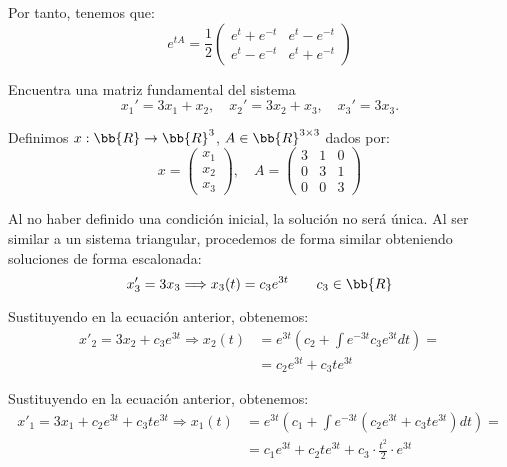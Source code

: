 \documentclass[12pt]{article}
\begin{document}
\begin{ejercicio}
        Por tanto, tenemos que:
        \begin{equation*}
            e^{tA} = \frac{1}{2}\begin{pmatrix}
                e^t+e^{-t} & e^t - e^{-t} \\
                e^t-e^{-t} & e^t+e^{-t}
            \end{pmatrix}
        \end{equation*}
    \end{ejercicio}

    \begin{ejercicio}
        Encuentra una matriz fundamental del sistema
        \begin{equation*}
            x_1' = 3x_1 + x_2, \quad x_2' = 3x_2+x_3,\quad x_3' = 3x_3.
        \end{equation*}

        Definimos $x:\bb{R}\to \bb{R}^3$, $A\in \bb{R}^{3\times 3}$ dados por:
        \begin{equation*}
            x=\begin{pmatrix}
                x_1 \\
                x_2 \\
                x_3
            \end{pmatrix},\quad A=\begin{pmatrix}
                3 & 1 & 0 \\
                0 & 3 & 1 \\
                0 & 0 & 3
            \end{pmatrix}
        \end{equation*}

        Al no haber definido una condición inicial, la solución no será única. Al ser similar a un sistema triangular, procedemos de forma similar obteniendo soluciones de forma escalonada:
        \begin{equation*}
            x'_3=3x_3\Longrightarrow x_3(t)=c_3e^{3t} \qquad c_3\in\bb{R}
        \end{equation*}

        Sustituyendo en la ecuación anterior, obtenemos:
        \begin{align*}
            x'_2=3x_2+c_3e^{3t}\Longrightarrow
            x_2(t)&=e^{3t}\left(c_2+\int e^{-3t}c_3e^{3t}dt\right)
            =\\&= c_2e^{3t}+c_3te^{3t}
        \end{align*}

        Sustituyendo en la ecuación anterior, obtenemos:
        \begin{align*}
            x'_1=3x_1+c_2e^{3t}+c_3te^{3t}\Longrightarrow
            x_1(t)&=e^{3t}\left(c_1+\int e^{-3t}\left(c_2e^{3t}+c_3te^{3t}\right)dt\right)
            =\\&= c_1e^{3t}+c_2te^{3t}+c_3\cdot \frac{t^2}{2}\cdot e^{3t}
        \end{align*}


\end{ejercicio}
\end{document}
